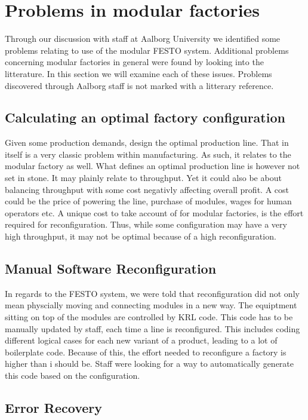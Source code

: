 \section{Problems in modular factories}
Through our discussion with staff at Aalborg University we identified some problems relating to use of the modular FESTO system. Additional problems concerning modular factories in general were found by looking into the litterature. In this section we will examine each of these issues. Problems discovered through Aalborg staff is not marked with a litterary reference.

\subsection{Calculating an optimal factory configuration}
Given some production demands, design the optimal production line. That in itself is a very classic problem within manufacturing. As such, it relates to the modular factory as well. What defines an optimal production line is however not set in stone. It may plainly relate to throughput. Yet it could also be about balancing throughput with some cost negativly affecting overall profit. A cost could be the price of powering the line, purchase of modules, wages for human operators etc. A unique cost to take account of for modular factories, is the effort required for reconfiguration. Thus, while some configuration may have a very high throughput, it may not be optimal because of a high reconfiguration.  

\subsection{Manual Software Reconfiguration}
In regards to the FESTO system, we were told that reconfiguration did not only mean physcially moving and connecting modules in a new way. The equiptment sitting on top of the modules are controlled by KRL code. This code has to be manually updated by staff, each time a line is reconfigured. This includes coding different logical cases for each new variant of a product, leading to a lot of boilerplate code. Because of this, the effort needed to reconfigure a factory is higher than i should be. Staff were looking for a way to automatically generate this code based on the configuration.

\subsection{Error Recovery}




